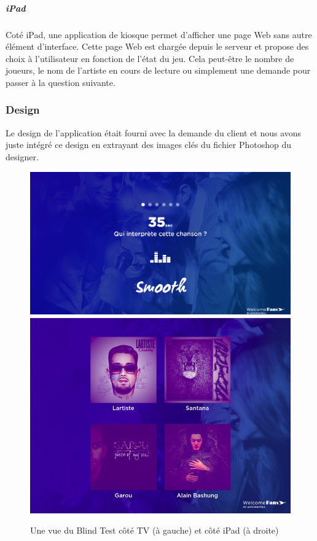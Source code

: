 \subparagraph{iPad} Coté iPad, une application de kiosque permet d'afficher une page Web sans autre élément d'interface.
Cette page Web est chargée depuis le serveur et propose des choix à l'utilisateur en fonction de l'état du jeu.
Cela peut-être le nombre de joueurs, le nom de l'artiste en cours de lecture ou simplement une demande pour passer à la question suivante.

\subsubsection{Design}

Le design de l'application était fourni avec la demande du client et nous avons juste intégré ce design en extrayant des images clés du fichier Photoshop du designer.

\begin{figure}[h]
    \centering
    \includegraphics[scale=0.23]{img/blind-test-tv.png}
    \includegraphics[scale=0.22]{img/blind-test-ipad.png}
    \caption{Une vue du Blind Test côté TV (à gauche) et côté iPad (à droite)}
\end{figure}


